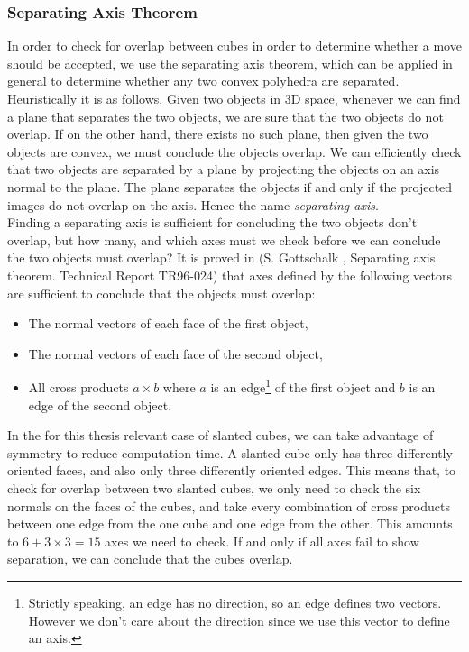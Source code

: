 \documentclass[thesis]{subfiles}
\begin{document}
\subsubsection{Separating Axis Theorem}\label{subsec:sep ax thm}

In order to check for overlap between cubes in order to determine whether a move should be accepted, we use the separating axis theorem, which can be applied in general to determine whether any two convex polyhedra are separated. Heuristically it is as follows. Given two objects in 3D space, whenever we can find a plane that separates the two objects, we are sure that the two objects do not overlap. If on the other hand, there exists no such plane, then given the two objects are convex, we must conclude the objects overlap. We can efficiently check that two objects are separated by a plane by projecting the objects on an axis normal to the plane. The plane separates the objects if and only if the projected images do not overlap on the axis. Hence the name \emph{separating axis}. \\

Finding a separating axis is sufficient for concluding the two objects don't overlap, but how many, and which axes must we check before we can conclude the two objects must overlap? It is proved in  (S. Gottschalk , Separating axis theorem. Technical Report TR96-024) that axes defined by the following vectors are sufficient to conclude that the objects must overlap:
\begin{itemize}
	\item The normal vectors of each face of the first object,
	\item The normal vectors of each face of the second object,
	\item All cross products $a \times b$ where $a$ is an edge\footnote{Strictly speaking, an edge has no direction, so an edge defines two vectors. However we don't care about the direction since we use this vector to define an axis.} of the first object and $b$ is an edge of the second object.
\end{itemize}

In the for this thesis relevant case of slanted cubes, we can take advantage of symmetry to reduce computation time. A slanted cube only has three differently oriented faces, and also only three differently oriented edges. This means that, to check for overlap between two slanted cubes, we only need to check the six normals on the faces of the cubes, and take every combination of cross products between one edge from the one cube and one edge from the other. This amounts to $6 + 3 \times 3 = 15$ axes we need to check. If and only if all axes fail to show separation, we can conclude that the cubes overlap.
\end{document}
